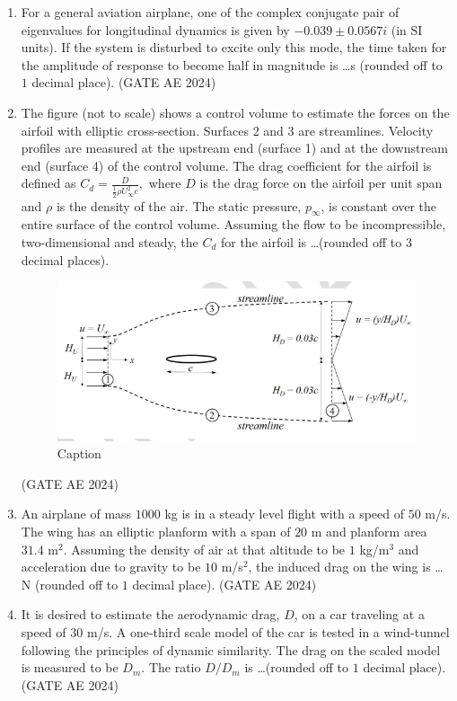 \documentclass[journal,12pt,onecolumn]{IEEEtran}
\theoremstyle{remark}
\begin{document}
\begin{enumerate}
\item For a general aviation airplane, one of the complex conjugate pair of eigenvalues for longitudinal dynamics is given by $-0.039 \pm 0.0567i$ (in SI units). If the system is disturbed to excite only this mode, the time taken for the amplitude of response to become half in magnitude is \dots s (rounded off to $1$ decimal place).
\hfill(GATE AE 2024)

\item The figure (not to scale) shows a control volume to estimate the forces on the airfoil with elliptic cross-section. Surfaces 2 and 3 are streamlines. Velocity profiles are measured at the upstream end (surface 1) and at the downstream  end (surface 4) of the control volume.  The drag coefficient for the airfoil is defined as 
$
C_d = \frac{D}{\frac{1}{2} \rho U_\infty^2 c},
$
where $D$ is the drag force on the airfoil per unit span and $\rho$ is the density of the air. The static pressure, $p_\infty$, is constant over the entire surface of the control volume. Assuming the flow to be incompressible, two-dimensional and steady, the $C_d$ for the airfoil is \dots (rounded off to $3$ decimal places).

\begin{figure}[H]
    \centering
    \includegraphics[width=0.5\columnwidth]{figs/Screenshot 2025-08-24 063236.png}
    \caption{Caption}
    \label{fig:placeholder}
\end{figure}
\hfill(GATE AE 2024)
 
\item An airplane of mass $1000$ kg is in a steady level flight with a speed of $50$ m/s. The wing has an elliptic planform with a span of $20$ m and planform area $31.4$ m$^2$. Assuming the density of air at that altitude to be $1$ kg/m$^3$ and acceleration due to gravity to be $10$ m/s$^2$, the induced drag on the wing is \dots N (rounded off to $1$ decimal place).
\hfill(GATE AE 2024)

\item It is desired to estimate the aerodynamic drag, $D$, on a car traveling at a speed of $30$ m/s. A one-third scale model of the car is tested in a wind-tunnel following the principles of dynamic similarity. The drag on the scaled model is measured to be $D_m$. The ratio $D/D_m$ is \dots (rounded off to $1$ decimal place).
\hfill(GATE AE 2024)

    
\end{enumerate}
\end{document}
